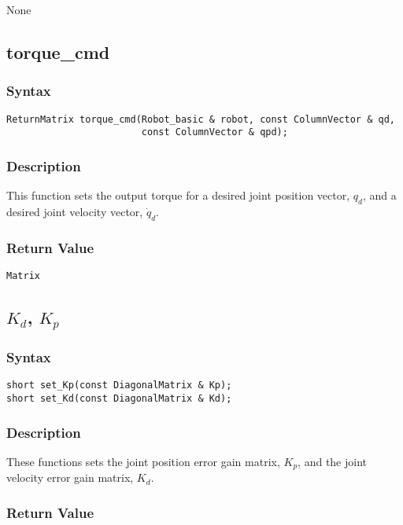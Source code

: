 \documentclass[dvips,11pt,fleqn]{report}
\begin{document}
None

\newpage

\subsection*{torque\_cmd}
\subsubsection*{Syntax}
\begin{verbatim}
ReturnMatrix torque_cmd(Robot_basic & robot, const ColumnVector & qd,
                        const ColumnVector & qpd);
\end{verbatim}

\subsubsection*{Description}   
This function sets the output torque for a desired joint position
vector, $q_d$, and a desired joint velocity vector, $\dot{q}_d$.

\subsubsection*{Return Value}

\texttt{Matrix}

\newpage

\subsection*{$K_d$, $K_p$}
\subsubsection*{Syntax}
\begin{verbatim}
short set_Kp(const DiagonalMatrix & Kp);
short set_Kd(const DiagonalMatrix & Kd);

\end{verbatim}

\subsubsection*{Description}   
These functions sets the joint position error gain matrix, $K_p$, and
the joint velocity error gain matrix, $K_d$.
\subsubsection*{Return Value}
\end{document}
